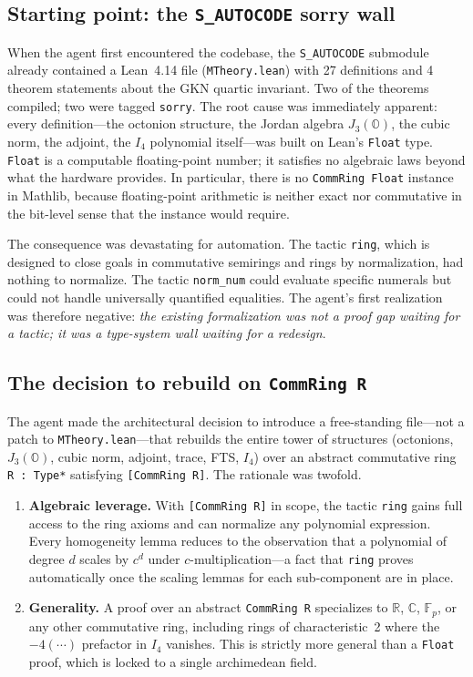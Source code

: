 \documentclass[11pt]{article}
\theoremstyle{definition}
\newcommand{\OO}{\mathbb{O}}
\newcommand{\RR}{\mathbb{R}}
\newcommand{\CC}{\mathbb{C}}
\newcommand{\FF}{\mathbb{F}}
\newcommand{\Jthree}{J_3(\OO)}
\newcommand{\Iq}{I_4}
\begin{document}
\subsection{Starting point: the \texttt{S\_AUTOCODE} sorry wall}
\label{sec:agent-start}

When the agent first encountered the codebase, the \texttt{S\_AUTOCODE}
submodule already contained a Lean~4.14 file (\texttt{MTheory.lean}) with
27 definitions and 4 theorem statements about the GKN quartic invariant.
Two of the theorems compiled; two were tagged \texttt{sorry}. The root
cause was immediately apparent: every definition---the octonion structure,
the Jordan algebra $\Jthree$, the cubic norm, the adjoint, the $\Iq$
polynomial itself---was built on Lean's \texttt{Float} type. \texttt{Float}
is a computable floating-point number; it satisfies no algebraic laws
beyond what the hardware provides. In particular, there is no
\texttt{CommRing Float} instance in Mathlib, because floating-point
arithmetic is neither exact nor commutative in the bit-level sense that
the instance would require.

The consequence was devastating for automation. The tactic \texttt{ring},
which is designed to close goals in commutative semirings and rings by
normalization, had nothing to normalize. The tactic \texttt{norm\_num}
could evaluate specific numerals but could not handle universally
quantified equalities. The agent's first realization was therefore
negative: \emph{the existing formalization was not a proof gap waiting
for a tactic; it was a type-system wall waiting for a redesign}.

\subsection{The decision to rebuild on \texttt{CommRing R}}
\label{sec:agent-decision}

The agent made the architectural decision to introduce a free-standing
file---not a patch to \texttt{MTheory.lean}---that rebuilds the entire
tower of structures (octonions, $\Jthree$, cubic norm, adjoint, trace,
FTS, $\Iq$) over an abstract commutative ring \texttt{R : Type*}
satisfying \texttt{[CommRing R]}. The rationale was twofold.

\begin{enumerate}[leftmargin=2em]
\item \textbf{Algebraic leverage.} With \texttt{[CommRing R]} in scope,
the tactic \texttt{ring} gains full access to the ring axioms and can
normalize any polynomial expression. Every homogeneity lemma reduces to
the observation that a polynomial of degree $d$ scales by $c^d$ under
$c$-multiplication---a fact that \texttt{ring} proves automatically once
the scaling lemmas for each sub-component are in place.

\item \textbf{Generality.} A proof over an abstract \texttt{CommRing R}
specializes to $\RR$, $\CC$, $\FF_p$, or any other commutative ring,
including rings of characteristic~2 where the $-4(\cdots)$ prefactor in
$\Iq$ vanishes. This is strictly more general than a \texttt{Float}
proof, which is locked to a single archimedean field.
\end{enumerate}
\end{document}
